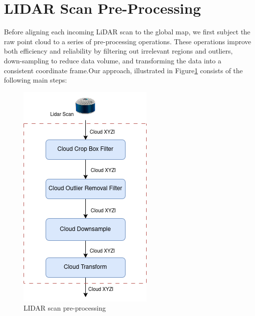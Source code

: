 \section{LIDAR Scan Pre-Processing}
Before aligning each incoming LiDAR scan to the global map, we first subject the raw point cloud to a series of pre-processing operations. These operations improve both efficiency and reliability by filtering out irrelevant regions and outliers, down-sampling to reduce data volume, and transforming the data into a consistent coordinate frame.Our approach, illustrated in Figure\ref{fig:lidar_scan_preprocessing}  consists of the following  main steps:
\begin{figure}
    \centering
    \includegraphics[width=0.4\linewidth]{images/LIDAR_PreProccess.drawio.png}
    \caption{LIDAR scan pre-processing}
    \label{fig:lidar_scan_preprocessing}
\end{figure}

